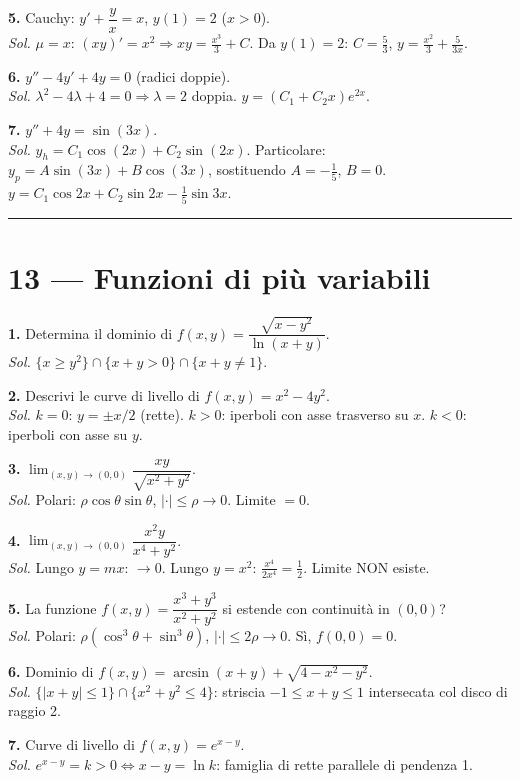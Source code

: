 \documentclass[11pt,a4paper]{article}
\begin{document}
\textbf{5.} Cauchy: $y'+\dfrac{y}{x}=x$, $y(1)=2$ ($x>0$).\\
\emph{Sol.} $\mu=x$: $(xy)'=x^2\Rightarrow xy=\tfrac{x^3}{3}+C$. Da $y(1)=2$: $C=\tfrac{5}{3}$, $y=\tfrac{x^2}{3}+\tfrac{5}{3x}$.

\textbf{6.} $y''-4y'+4y=0$ (radici doppie).\\
\emph{Sol.} $\lambda^2-4\lambda+4=0\Rightarrow\lambda=2$ doppia. $y=(C_1+C_2 x)e^{2x}$.

\textbf{7.} $y''+4y=\sin(3x)$.\\
\emph{Sol.} $y_h=C_1\cos(2x)+C_2\sin(2x)$. Particolare: $y_p=A\sin(3x)+B\cos(3x)$, sostituendo $A=-\tfrac{1}{5}$, $B=0$. $y=C_1\cos 2x+C_2\sin 2x-\tfrac{1}{5}\sin 3x$.

\medskip\hrule\medskip

\section*{13 — Funzioni di più variabili}

\textbf{1.} Determina il dominio di $f(x,y)=\dfrac{\sqrt{x-y^2}}{\ln(x+y)}$.\\
\emph{Sol.} $\{x\ge y^2\}\cap\{x+y>0\}\cap\{x+y\ne 1\}$.

\textbf{2.} Descrivi le curve di livello di $f(x,y)=x^2-4y^2$.\\
\emph{Sol.} $k=0$: $y=\pm x/2$ (rette). $k>0$: iperboli con asse trasverso su $x$. $k<0$: iperboli con asse su $y$.

\textbf{3.} $\displaystyle\lim_{(x,y)\to(0,0)}\dfrac{xy}{\sqrt{x^2+y^2}}$.\\
\emph{Sol.} Polari: $\rho\cos\theta\sin\theta$, $|\cdot|\le\rho\to 0$. Limite $=0$.

\textbf{4.} $\displaystyle\lim_{(x,y)\to(0,0)}\dfrac{x^2 y}{x^4+y^2}$.\\
\emph{Sol.} Lungo $y=mx$: $\to 0$. Lungo $y=x^2$: $\tfrac{x^4}{2x^4}=\tfrac{1}{2}$. Limite NON esiste.

\textbf{5.} La funzione $f(x,y)=\dfrac{x^3+y^3}{x^2+y^2}$ si estende con continuità in $(0,0)$?\\
\emph{Sol.} Polari: $\rho(\cos^3\theta+\sin^3\theta)$, $|\cdot|\le 2\rho\to 0$. Sì, $f(0,0)=0$.

\textbf{6.} Dominio di $f(x,y)=\arcsin(x+y)+\sqrt{4-x^2-y^2}$.\\
\emph{Sol.} $\{|x+y|\le 1\}\cap\{x^2+y^2\le 4\}$: striscia $-1\le x+y\le 1$ intersecata col disco di raggio 2.

\textbf{7.} Curve di livello di $f(x,y)=e^{x-y}$.\\
\emph{Sol.} $e^{x-y}=k>0\iff x-y=\ln k$: famiglia di rette parallele di pendenza 1.
\end{document}
